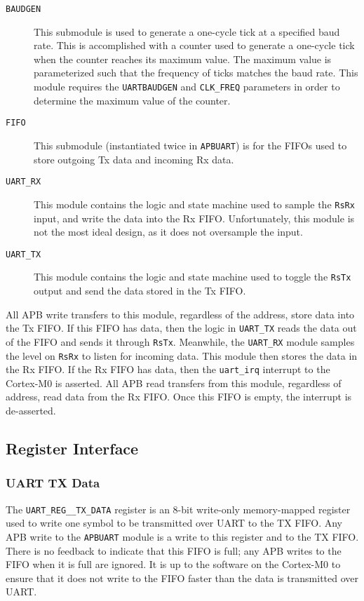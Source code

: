 \begin{description}
	\item[\texttt{BAUDGEN}] This submodule is used to generate a one-cycle tick at a specified baud rate. This is accomplished with a counter used to generate a one-cycle tick when the counter reaches its maximum value. The maximum value is parameterized such that the frequency of ticks matches the baud rate. This module requires the \texttt{UARTBAUDGEN} and \texttt{CLK\_FREQ} parameters in order to determine the maximum value of the counter.
	\item[\texttt{FIFO}] This submodule (instantiated twice in \texttt{APBUART}) is for the FIFOs used to store outgoing Tx data and incoming Rx data.
	\item[\texttt{UART\_RX}] This module contains the logic and state machine used to sample the \texttt{RsRx} input, and write the data into the Rx FIFO. Unfortunately, this module is not the most ideal design, as it does not oversample the input.
	\item[\texttt{UART\_TX}] This module contains the logic and state machine used to toggle the \texttt{RsTx} output and send the data stored in the Tx FIFO.
\end{description}

All APB write transfers to this module, regardless of the address, store data into the Tx FIFO. If this FIFO has data, then the logic in \texttt{UART\_TX} reads the data out of the FIFO and sends it through \texttt{RsTx}. Meanwhile, the \texttt{UART\_RX} module samples the level on \texttt{RsRx} to listen for incoming data. This module then stores the data in the Rx FIFO. If the Rx FIFO has data, then the \texttt{uart\_irq} interrupt to the Cortex-M0 is asserted. All APB read transfers from this module, regardless of address, read data from the Rx FIFO. Once this FIFO is empty, the interrupt is de-asserted.

\subsection{Register Interface} \label{uart-registers}
\subsubsection{UART TX Data}
The \texttt{UART\_REG\_\_TX\_DATA} register is an 8-bit write-only memory-mapped register used to write one symbol to be transmitted over UART to the TX FIFO. Any APB write to the \texttt{APBUART} module is a write to this register and to the TX FIFO. There is no feedback to indicate that this FIFO is full; any APB writes to the FIFO when it is full are ignored. It is up to the software on the Cortex-M0 to ensure that it does not write to the FIFO faster than the data is transmitted over UART.

